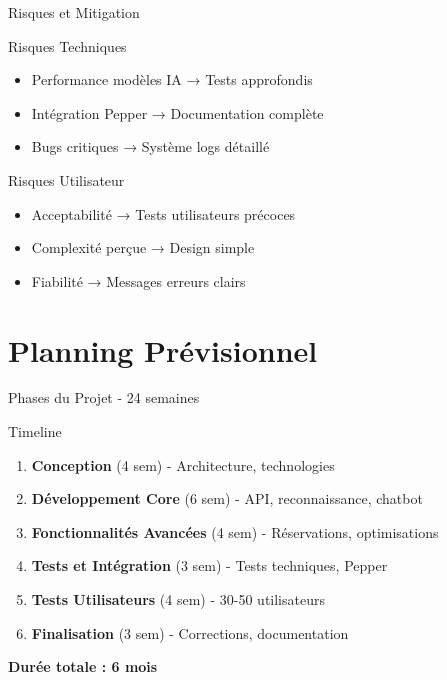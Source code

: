 \documentclass[aspectratio=169,11pt]{beamer}
\begin{document}
\begin{frame}{Risques et Mitigation}
\begin{block}{Risques Techniques}
\begin{itemize}
    \item Performance modèles IA → Tests approfondis
    \item Intégration Pepper → Documentation complète
    \item Bugs critiques → Système logs détaillé
\end{itemize}
\end{block}

\begin{block}{Risques Utilisateur}
\begin{itemize}
    \item Acceptabilité → Tests utilisateurs précoces
    \item Complexité perçue → Design simple
    \item Fiabilité → Messages erreurs clairs
\end{itemize}
\end{block}
\end{frame}


\section{Planning Prévisionnel}

\begin{frame}{Phases du Projet - 24 semaines}
\begin{block}{Timeline}
\begin{enumerate}
    \item \textbf{Conception} (4 sem) - Architecture, technologies
    \item \textbf{Développement Core} (6 sem) - API, reconnaissance, chatbot
    \item \textbf{Fonctionnalités Avancées} (4 sem) - Réservations, optimisations
    \item \textbf{Tests et Intégration} (3 sem) - Tests techniques, Pepper
    \item \textbf{Tests Utilisateurs} (4 sem) - 30-50 utilisateurs
    \item \textbf{Finalisation} (3 sem) - Corrections, documentation
\end{enumerate}
\end{block}

\begin{center}
\textbf{Durée totale : 6 mois}
\end{center}
\end{frame}
\end{document}
